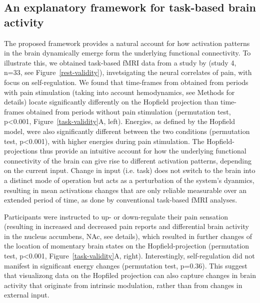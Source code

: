 \documentclass{article}
\begin{document}
\subsection{An explanatory framework for task-based brain activity}\label{An explanatory framework for task-based brain activity}

The proposed framework provides a natural account for how activation patterns in the brain dynamically emerge form the underlying functional connectivity. To illustrate this, we obtained task-based fMRI data from a study by \cite{Woo_2015} (study 4, n=33, see Figure~\ref{rest-validity}), invetsigating the neural correlates of pain, with focus on self-regulation.
We found that time-frames from obtained from periods with pain stimulation (taking into account hemodynamics, see Methods for details) locate significantly differently on the Hopfield projection than time-frames obtained from periods without pain stimulation (permutation test, p\textless 0.001, Figure~\ref{task-validity}A, left). Energies, as defined by the Hopfield model, were also significantly different between the two conditions (permutation test, p\textless 0.001), with higher energies during pain stimulation. The Hopfield-projections thus provide an intuitive account for how the underlying functional connectivity of the brain can give rise to different activation patterns, depending on the current input. Change in input (i.e. task) does not switch to the brain into a distinct mode of operation but acts as a perturbation of the system's dyanmics, resulting in mean activations changes that are only reliable measurable over an extended period of time, as done by conventional task-based fMRI analyses.

Participants were instructed to up- or down-regulate their pain sensation (resulting in increased and decreased pain reports and differential brain activity in the nucleus accumbens, NAc, see \cite{Woo_2015} details), which resulted in further changes of the location of momentary brain states on the Hopfield-projection (permutation test, p\textless 0.001, Figure~\ref{task-validity}A, right). Interestingly, self-regulation did not manifest in significant energy changes (permutation test, p=0.36). This suggest that visualizong data on the Hopfiled projection can also capture changes in brain activity that originate from intrinsic modulation, rather than from changes in external input.
\end{document}
